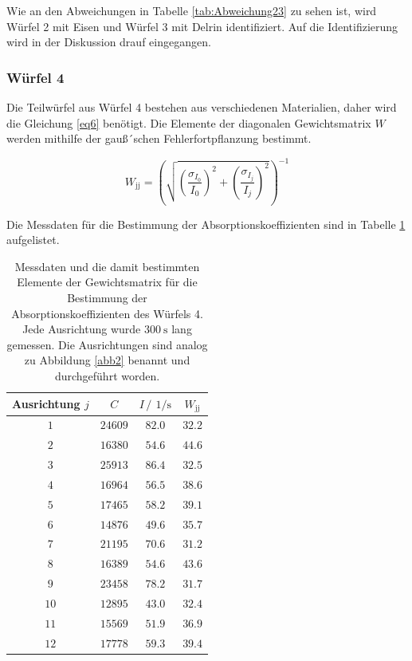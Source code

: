 Wie an den Abweichungen in Tabelle \ref{tab:Abweichung23} zu sehen ist, wird Würfel 2 mit Eisen und Würfel 3 mit Delrin identifiziert. Auf die 
Identifizierung wird in der Diskussion drauf eingegangen.

\subsubsection{Würfel 4}

Die Teilwürfel aus Würfel 4 bestehen aus verschiedenen Materialien, daher wird die Gleichung \ref{eq6} benötigt.
Die Elemente der diagonalen Gewichtsmatrix $W$ werden mithilfe der gauß´schen Fehlerfortpflanzung bestimmt.

\begin{equation*}
    W_{\text{jj}}= \left(\sqrt{\left(\frac{\sigma_{I_0}}{I_0}\right)^2+ \left(\frac{\sigma_{I_j}}{I_j}\right)^2}\right)^{-1}
\end{equation*}

Die Messdaten für die Bestimmung der Absorptionskoeffizienten sind in Tabelle \ref{tab:Messdaten_Würfel4} aufgelistet.

\FloatBarrier
\begin{table}
    \centering
    \caption{Messdaten und die damit bestimmten Elemente der Gewichtsmatrix für die Bestimmung der Absorptionskoeffizienten des Würfels 4. Jede Ausrichtung wurde $\SI{300}{\second}$ lang gemessen. Die Ausrichtungen sind analog zu Abbildung \ref{abb2} benannt und durchgeführt worden. }
    \label{tab:Messdaten_Würfel4}
    \begin{tabular}{c c c c}
        \toprule
        Ausrichtung $j$&$C$&$I\,/\,\SI{}{1\per\second}$&$W_{\text{jj}}$\\
        \midrule
        $\num{1}$&$\num{24609}$&$\num{82.0}$ &$\num{32.2}$\\
        $\num{2}$&$\num{16380}$&$\num{54.6}$ &$\num{44.6}$\\
        $\num{3}$&$\num{25913}$&$\num{86.4}$ &$\num{32.5}$\\
        $\num{4}$&$\num{16964}$&$\num{56.5}$ &$\num{38.6}$\\
        $\num{5}$&$\num{17465}$&$\num{58.2}$ &$\num{39.1}$\\
        $\num{6}$&$\num{14876}$&$\num{49.6}$ &$\num{35.7}$\\
        $\num{7}$&$\num{21195}$&$\num{70.6}$ &$\num{31.2}$\\
        $\num{8}$&$\num{16389}$&$\num{54.6}$ &$\num{43.6}$\\
        $\num{9}$&$\num{23458}$&$\num{78.2}$ &$\num{31.7}$\\
        $\num{10}$&$\num{12895}$&$\num{43.0}$&$\num{32.4}$\\
        $\num{11}$&$\num{15569}$&$\num{51.9}$&$\num{36.9}$\\
        $\num{12}$&$\num{17778}$&$\num{59.3}$&$\num{39.4}$\\
        \bottomrule
    \end{tabular}
\end{table}
\FloatBarrier

